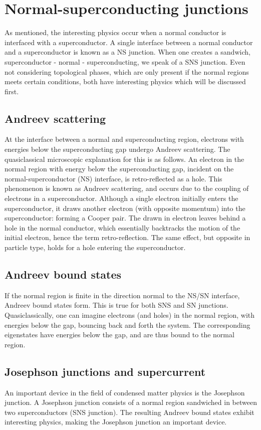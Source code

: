 \section{Normal-superconducting junctions}
	As mentioned, the interesting physics occur when a normal conductor is interfaced with a superconductor.
	A single interface between a normal conductor and a superconductor is known as a NS junction.
	When one creates a sandwich, superconductor - normal - superconducting, we speak of a SNS junction.
	Even not considering topological phases, which are only present if the normal regions meets certain conditions, both have interesting physics which will be discussed first.


	\subsection{Andreev scattering}
		At the interface between a normal and superconducting region, electrons with energies below the superconducting gap undergo Andreev scattering.
		The quasiclassical microscopic explanation for this is as follows.
		An electron in the normal region with energy below the superconducting gap, incident on the normal-superconductor (NS) interface, is retro-reflected as a hole.
		This phenomenon is known as Andreev scattering, and occurs due to the coupling of electrons in a superconductor.
		Although a single electron initially enters the superconductor, it draws another electron (with opposite momentum) into the superconductor: forming a Cooper pair.
		The drawn in electron leaves behind a hole in the normal conductor, which essentially backtracks the motion of the initial electron, hence the term retro-reflection.
		The same effect, but opposite in particle type, holds for a hole entering the superconductor.

	\subsection{Andreev bound states}
		If the normal region is finite in the direction normal to the NS/SN interface, Andreev bound states form.
		This is true for both SNS and SN junctions.
		Quasiclassically, one can imagine electrons (and holes) in the normal region, with energies below the gap, bouncing back and forth the system.
		The corresponding eigenstates have energies below the gap, and are thus bound to the normal region.

	\subsection{Josephson junctions and supercurrent}
		An important device in the field of condensed matter physics is the Josephson junction.
		A Josephson junction consists of a normal region sandwiched in between two superconductors (SNS junction).
		The resulting Andreev bound states exhibit interesting physics, making the Josephson junction an important device.

